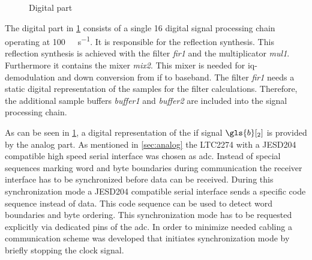 \documentclass[12pt,a4paper,parskip=full,abstract=true,BCOR=12mm]{scrreprt}
\def\device#1{\mbox{\textit{#1}}}
\begin{document}
\begin{figure}[htb]
    \caption{Digital part}
    \label{fig:digital}
\end{figure}

The digital part in \cref{fig:digital} consists of a single \SI{16}{\bit} digital signal processing
chain operating at \SI{100}{\mega\samples\per\second}. It is responsible
for the reflection synthesis. This reflection synthesis is achieved with
the filter \device{fir1} and the multiplicator \device{mul1}. Furthermore
it contains the mixer \device{mix2}. This mixer is needed for \gls{iq}-demodulation
and down conversion from \gls{if} to baseband. The filter \device{fir1}
needs a static digital representation of the samples for the filter calculations.
Therefore, the additional sample buffers \device{buffer1} and \device{buffer2} are
included into the signal processing chain.

As can be seen in \cref{fig:digital}, a digital representation of the \gls{if}
signal $\gls{b}[_2]$ is provided by the analog part. As mentioned in \cref{sec:analog}
the LTC2274 with a JESD204 compatible high speed serial interface was chosen as \gls{adc}.
Instead of special sequences marking word and byte boundaries during communication the receiver interface has
to be synchronized before data can be received. During this synchronization mode a JESD204
compatible serial interface sends a specific code sequence instead of data. This code sequence
can be used to detect word boundaries and byte ordering. This synchronization mode has to be requested explicitly via dedicated
pins of the \gls{adc}. In order to minimize needed cabling a communication scheme was
developed that initiates synchronization mode by briefly stopping the clock signal.
\end{document}

